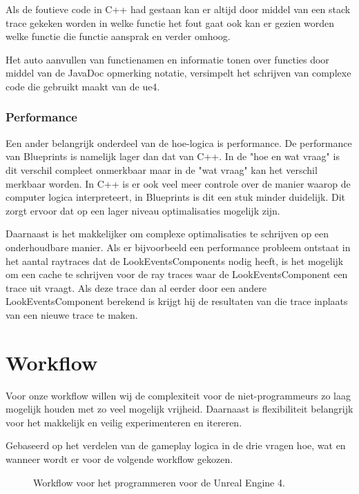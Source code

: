 Als de foutieve code in C++ had gestaan kan er altijd door middel van een stack trace gekeken worden in welke functie het fout gaat ook kan er gezien worden welke functie die functie aansprak en verder omhoog.

Het auto aanvullen van functienamen en informatie tonen over functies door middel van de JavaDoc opmerking notatie, versimpelt het schrijven van complexe code die gebruikt maakt van de \gls{ue4}. 

\subsubsection{Performance}
Een ander belangrijk onderdeel van de hoe-logica is performance. De performance van Blueprints is namelijk lager dan dat van C++. In de "hoe en wat vraag" is dit verschil compleet onmerkbaar maar in de "wat vraag" kan het verschil merkbaar worden.
In C++ is er ook veel meer controle over de manier waarop de computer logica interpreteert, in Blueprints is dit een stuk minder duidelijk. Dit zorgt ervoor dat op een lager niveau optimalisaties mogelijk zijn. 

Daarnaast is het makkelijker om complexe optimalisaties te schrijven op een onderhoudbare manier. Als er bijvoorbeeld een performance probleem ontstaat in het aantal raytraces dat de LookEventsComponents nodig heeft, is het mogelijk om een cache te schrijven voor de ray traces waar de LookEventsComponent een trace uit vraagt. Als deze trace dan al eerder door een andere LookEventsComponent berekend is krijgt hij de resultaten van die trace inplaats van een nieuwe trace te maken.

\section{Workflow}
Voor onze workflow willen wij de complexiteit voor de niet-programmeurs zo laag mogelijk houden met zo veel mogelijk vrijheid. Daarnaast is flexibiliteit belangrijk voor het makkelijk en veilig experimenteren en itereren.

Gebaseerd op het verdelen van de gameplay logica in de drie vragen hoe, wat en wanneer wordt er voor de volgende workflow gekozen.
    
\begin{figure}[H]
	\centering
	\caption{Workflow voor het programmeren voor de Unreal Engine 4.}
	\label{fig:workflow}
\end{figure}

